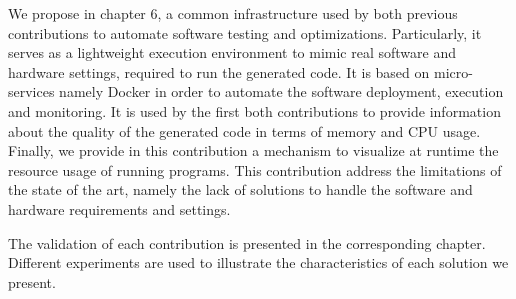 \begin{itemize}
	We propose in chapter 6, a common infrastructure used by both previous contributions to automate software testing and optimizations. Particularly, it serves as a lightweight execution environment to mimic real software and hardware settings, required to run the generated code. It is based on micro-services namely Docker in order to automate the software deployment, execution and monitoring. It is used by the first both contributions to provide information about the quality of the generated code in terms of memory and CPU usage. Finally, we provide in this contribution a mechanism to visualize at runtime the resource usage of running programs. This contribution address the limitations of the state of the art, namely the lack of solutions to handle the software and hardware requirements and settings.
\end{itemize}

The validation of each contribution is presented in the corresponding chapter. Different experiments are used to illustrate the characteristics of each solution we present.



